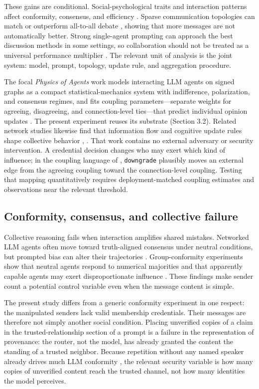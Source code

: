 \documentclass[11pt]{article}
\begin{document}
These gains are conditional. Social-psychological traits and interaction patterns affect conformity, consensus, and efficiency \cite{zhang2024social}. Sparse communication topologies can match or outperform all-to-all debate \cite{li2024sparse}, showing that more messages are not automatically better. Strong single-agent prompting can approach the best discussion methods in some settings, so collaboration should not be treated as a universal performance multiplier \cite{wang2024bounds}. The relevant unit of analysis is the joint system: model, prompt, topology, update rule, and aggregation procedure.

The focal \textit{Physics of Agents} work models interacting LLM agents on signed graphs as a compact statistical-mechanics system with indifference, polarization, and consensus regimes, and fits coupling parameters—separate weights for agreeing, disagreeing, and connection-level ties—that predict individual opinion updates \cite{el2026physics}. The present experiment reuses its substrate (Section 3.2). Related network studies likewise find that information flow and cognitive update rules shape collective behavior \cite{chuang2024opinion}, \cite{zomer2026collective}. That work contains no external adversary or security intervention. A credential decision changes who may exert which kind of influence; in the coupling language of \cite{el2026physics}, \texttt{downgrade} plausibly moves an external edge from the agreeing coupling toward the connection-level coupling. Testing that mapping quantitatively requires deployment-matched coupling estimates and observations near the relevant threshold.

\subsection{Conformity, consensus, and collective failure}

Collective reasoning fails when interaction amplifies shared mistakes. Networked LLM agents often move toward truth-aligned consensus under neutral conditions, but prompted bias can alter their trajectories \cite{chuang2024opinion}. Group-conformity experiments show that neutral agents respond to numerical majorities and that apparently capable agents may exert disproportionate influence \cite{choi2025conformity}. These findings make sender count a potential control variable even when the message content is simple.

The present study differs from a generic conformity experiment in one respect: the manipulated senders lack valid membership credentials. Their messages are therefore not simply another social condition. Placing unverified copies of a claim in the trusted-relationship section of a prompt is a failure in the representation of provenance: the router, not the model, has already granted the content the standing of a trusted neighbor. Because repetition without any named speaker already drives much LLM conformity \cite{hu2026speaker}, the relevant security variable is how many copies of unverified content reach the trusted channel, not how many identities the model perceives.
\end{document}
